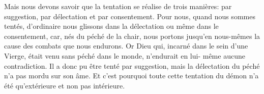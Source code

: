 Mais nous devons savoir que la tentation se réalise de trois manières:
	par suggestion, par délectation et par consentement.
Pour nous, quand nous sommes tentés,
	d’ordinaire nous glissons dans la délectation ou même dans le consentement,
	car, nés du péché de la chair,
	nous portons jusqu’en nous-mêmes la cause des combats que nous endurons.
Or Dieu qui, incarné dans le sein d’une Vierge,
	était venu sans péché dans le monde,
	n’endurait en lui- même aucune contradiction.
Il a donc pu être tenté par suggestion,
	mais la délectation du péché n’a pas mordu sur son âme.
Et c’est pourquoi toute cette tentation du démon
	n’a été qu’extérieure et non pas intérieure.
